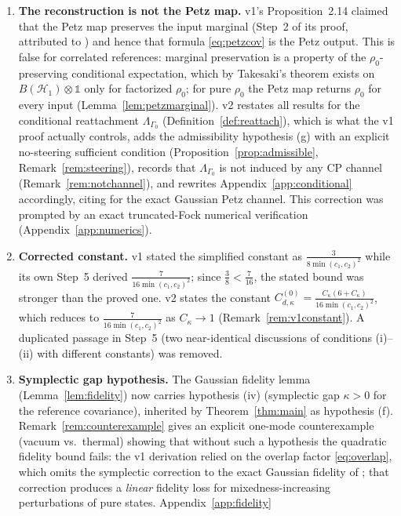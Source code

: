 \documentclass[11pt,a4paper]{article}
\newcommand{\idm}{\mathds{1}}}{\newcommand{\idm}{\mathbf{1}}}
\theoremstyle{plain}
\theoremstyle{definition}
\theoremstyle{remark}
\newcommand{\Hh}{\mathcal{H}}
\newcommand{\Ckappa}{C_{\kappa}}
\newcommand{\Cd}{C^{(0)}_{d,\kappa}}
\begin{document}
\begin{enumerate}
\item \textbf{The reconstruction is not the Petz map.} v1's Proposition~2.14
claimed that the Petz map preserves the input marginal (Step~2 of its proof,
attributed to \cite{Petz86}) and hence that formula \eqref{eq:petzcov} is the
Petz output. This is false for correlated references: marginal preservation is a
property of the $\rho_0$-preserving conditional expectation, which by Takesaki's
theorem exists on $B(\Hh_1)\otimes\idm$ only for factorized $\rho_0$; for pure
$\rho_0$ the Petz map returns $\rho_0$ for every input
(Lemma~\ref{lem:petzmarginal}). v2 restates all results for the conditional
reattachment $\Lambda_{\Gamma_0}$ (Definition~\ref{def:reattach}), which is what
the v1 proof actually controls, adds the admissibility hypothesis (g) with an
explicit no-steering sufficient condition (Proposition~\ref{prop:admissible},
Remark~\ref{rem:steering}), records that $\Lambda_{\Gamma_0}$ is not induced by
any CP channel (Remark~\ref{rem:notchannel}), and rewrites
Appendix~\ref{app:conditional} accordingly, citing \cite{LamiDasWilde18} for the
exact Gaussian Petz channel. This correction was prompted by an exact
truncated-Fock numerical verification (Appendix~\ref{app:numerics}).
\item \textbf{Corrected constant.} v1 stated the simplified constant as
$\frac{3}{8\min(c_1,c_2)^2}$ while its own Step~5 derived
$\frac{7}{16\min(c_1,c_2)^2}$; since $\frac{3}{8} < \frac{7}{16}$, the stated
bound was stronger than the proved one. v2 states the constant
$\Cd = \frac{\Ckappa(6+\Ckappa)}{16\min(c_1,c_2)^2}$, which reduces to
$\frac{7}{16\min(c_1,c_2)^2}$ as $\Ckappa \to 1$ (Remark~\ref{rem:v1constant}).
A duplicated passage in Step~5 (two near-identical discussions of conditions
(i)--(ii) with different constants) was removed.
\item \textbf{Symplectic gap hypothesis.} The Gaussian fidelity lemma
(Lemma~\ref{lem:fidelity}) now carries hypothesis (iv) (symplectic gap
$\kappa > 0$ for the reference covariance), inherited by Theorem~\ref{thm:main}
as hypothesis (f). Remark~\ref{rem:counterexample} gives an explicit one-mode
counterexample (vacuum vs.\ thermal) showing that without such a hypothesis the
quadratic fidelity bound fails: the v1 derivation relied on the overlap factor
\eqref{eq:overlap}, which omits the symplectic correction to the exact Gaussian
fidelity of \cite{BanchiBP15}; that correction produces a \emph{linear} fidelity
loss for mixedness-increasing perturbations of pure states. Appendix~\ref{app:fidelity}

\end{enumerate}
\end{document}
